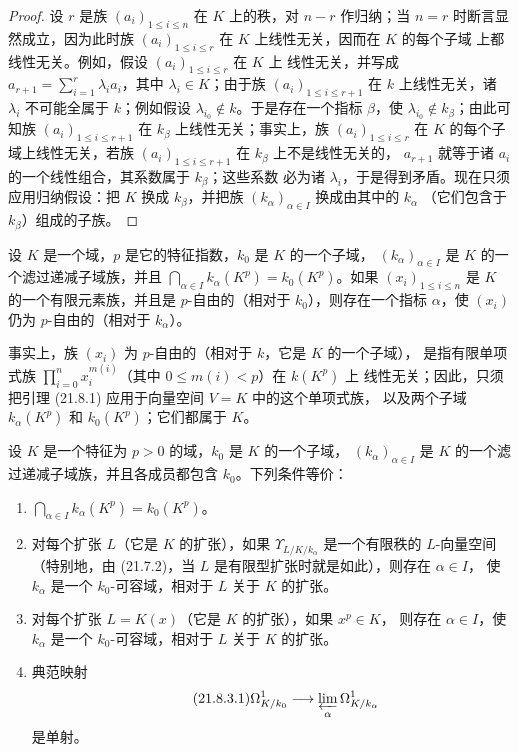 \begin{proof}
设 $r$ 是族 $(a_i)_{1\leqslant i\leqslant n}$ 在 $K$ 上的秩，对 $n-r$
作归纳；当 $n=r$ 时断言显然成立，因为此时族
$(a_i)_{1\leqslant i\leqslant r}$ 在 $K$ 上线性无关，因而在 $K$ 的每个子域
上都线性无关。例如，假设 $(a_i)_{1\leqslant i\leqslant r}$ 在 $K$ 上
线性无关，并写成
$a_{r+1}=\sum_{i=1}^r\lambda_i a_i$，其中 $\lambda_i\in K$；由于族
$(a_i)_{1\leqslant i\leqslant r+1}$ 在 $k$ 上线性无关，诸 $\lambda_i$
不可能全属于 $k$；例如假设
$\lambda_{i_0}\notin k$。于是存在一个指标 $\beta$，使
$\lambda_{i_0}\notin k_\beta$；由此可知族
$(a_i)_{1\leqslant i\leqslant r+1}$ 在 $k_\beta$ 上线性无关；事实上，族
$(a_i)_{1\leqslant i\leqslant r}$ 在 $K$ 的每个子域上线性无关，若族
$(a_i)_{1\leqslant i\leqslant r+1}$ 在 $k_\beta$ 上不是线性无关的，
$a_{r+1}$ 就等于诸 $a_i$ 的一个线性组合，其系数属于 $k_\beta$；这些系数
必为诸 $\lambda_i$，于是得到矛盾。现在只须应用归纳假设：把 $K$ 换成
$k_\beta$，并把族 $(k_\alpha)_{\alpha\in I}$ 换成由其中的 $k_\alpha$
（它们包含于 $k_\beta$）组成的子族。
\end{proof}

\begin{lemma}[21.8.2]
\label{0.21.8.2-fr}
设 $K$ 是一个域，$p$ 是它的特征指数，$k_0$ 是 $K$ 的一个子域，
$(k_\alpha)_{\alpha\in I}$ 是 $K$ 的一个滤过递减子域族，并且
$\bigcap_{\alpha\in I}k_\alpha(K^p)=k_0(K^p)$。如果
$(x_i)_{1\leqslant i\leqslant n}$ 是 $K$ 的一个有限元素族，并且是
$p$-自由的（相对于 $k_0$），则存在一个指标 $\alpha$，使 $(x_i)$ 仍为
$p$-自由的（相对于 $k_\alpha$）。

事实上，族 $(x_i)$ 为 $p$-自由的（相对于 $k$，它是 $K$ 的一个子域），
是指有限单项式族
$\prod_{i=0}^n x_i^{m(i)}$（其中 $0\leqslant m(i)<p$）在 $k(K^p)$ 上
线性无关；因此，只须把引理 (21.8.1) 应用于向量空间 $V=K$ 中的这个单项式族，
以及两个子域 $k_\alpha(K^p)$ 和 $k_0(K^p)$；它们都属于 $K$。
\end{lemma}

\begin{theorem}[21.8.3]
\label{0.21.8.3-fr}
设 $K$ 是一个特征为 $p>0$ 的域，$k_0$ 是 $K$ 的一个子域，
$(k_\alpha)_{\alpha\in I}$ 是 $K$ 的一个滤过递减子域族，并且各成员都包含
$k_0$。下列条件等价：
\begin{enumerate}
  \item[\rm a)] $\bigcap_{\alpha\in I}k_\alpha(K^p)=k_0(K^p)$。
  \item[\rm b)] 对每个扩张 $L$（它是 $K$ 的扩张），如果
  $\Upsilon_{L/K/k_\alpha}$ 是一个有限秩的 $L$-向量空间（特别地，由
  (21.7.2)，当 $L$ 是有限型扩张时就是如此），则存在 $\alpha\in I$，
  使 $k_\alpha$ 是一个 $k_0$-可容域，相对于 $L$ 关于 $K$ 的扩张。
  \item[\rm b$'$)] 对每个扩张 $L=K(x)$（它是 $K$ 的扩张），如果 $x^p\in K$，
  则存在 $\alpha\in I$，使 $k_\alpha$ 是一个 $k_0$-可容域，相对于
  $L$ 关于 $K$ 的扩张。
  \item[\rm c)] 典范映射
\begin{equation}
\tag{21.8.3.1}
\label{0.21.8.3.1-fr}
\Omega^1_{K/k_0}\longrightarrow\varprojlim_{\alpha}\Omega^1_{K/k_\alpha}
\end{equation}
是单射。
\end{enumerate}
\end{theorem}

